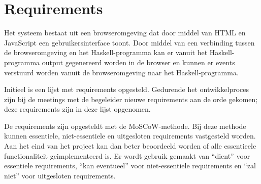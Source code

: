 \chapter{Requirements} \label{hoofdstuk:requirements}


Het systeem bestaat uit een browseromgeving dat door middel van HTML en JavaScript een gebruikersinterface toont. Door middel van een verbinding tussen de browseromgeving en het Haskell-programma kan er vanuit het Haskell-programma output gegenereerd worden in de browser en kunnen er events verstuurd worden vanuit de browseromgeving naar het Haskell-programma.

Initieel is een lijst met requirements opgesteld. Gedurende het ontwikkelproces zijn bij de meetings met de begeleider nieuwe requirements aan de orde gekomen; deze requirements zijn in deze lijst opgenomen.

De requirements zijn opgesteldt met de MoSCoW-methode. Bij deze methode kunnen essentiele, niet-essentiele en uitgesloten requirements vastgesteld worden. Aan het eind van het project kan dan beter beoordeeld worden of alle essentieele functionaliteit geimplementeerd is. Er wordt gebruik gemaakt van ``dient'' voor essentiele requirements, ``kan eventueel'' voor niet-essentiele requirements en ``zal niet'' voor uitgesloten requirements.

